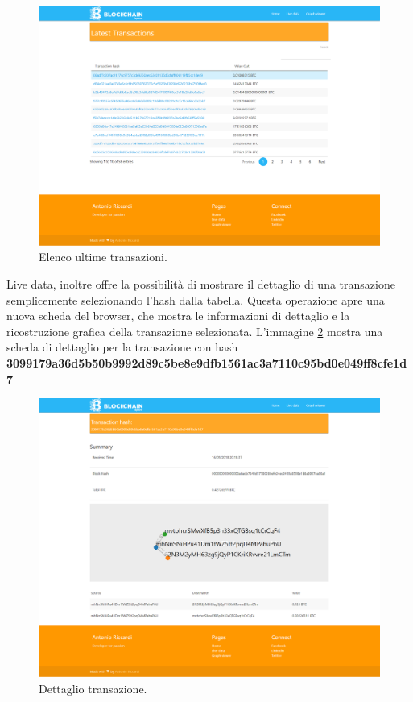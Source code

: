 \begin{figure}[H]
	\centering
	\includegraphics[width=\textwidth, height=0.70\textheight]{images/lastTransaction.png}
	\caption{Elenco ultime transazioni.}
	\label{fig:transactionsBE}
\end{figure}
Live data, inoltre offre la possibilità di mostrare il dettaglio di una transazione semplicemente selezionando l'hash dalla tabella. Questa operazione apre una nuova scheda del browser, che mostra le informazioni di dettaglio e la ricostruzione grafica della transazione selezionata. L'immagine \ref{fig:detailBE} mostra una scheda di dettaglio per la transazione con hash \textbf{3099179a36d5b50b9992d89c5be8e9dfb1561ac3a7110c95bd0e049ff8cfe1d7}
\begin{figure}[H]
	\centering
	\includegraphics[width=\textwidth, height=0.70\textheight]{images/infoTransaction2.png}
	\caption{Dettaglio transazione.}
	\label{fig:detailBE}
\end{figure}
